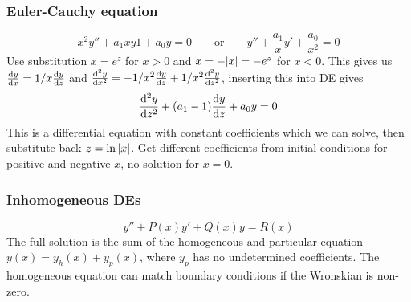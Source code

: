 \documentclass[a4paper, 10pt]{article}
\begin{document}
\begin{multicols*}{3}
\subsubsection*{\small Euler-Cauchy equation}
$$ x^2y'' + a_1xy1+a_0y = 0\qquad \text{or}\qquad y''+\frac{a_1}{x}y' + \frac{a_0}{x^2}=0$$
Use substitution $x=e^{z}$ for $x>0$ and $x=-\abs{x}=-e^{z}$ for $x<0$. This gives us $\dv{y}{x}=1/x\dv{y}{z}$ and $\dv[2]{y}{x} = -1/x^2 \dv{y}{z} + 1/x^2\dv[2]{y}{z}$, inserting this into DE gives
$$ \dv[2]{y}{z} + (a_1-1)\dv{y}{z} + a_0y = 0$$
This is a differential equation with constant coefficients which we can solve, then substitute back $z=\ln{\abs{x}}$. Get different coefficients from initial conditions for positive and negative $x$, no solution for $x=0$.

\subsubsection*{Inhomogeneous DEs}
$$y'' + P(x)y' +Q(x)y = R(x)$$
The full solution is the sum of the homogeneous and particular equation $y(x)=y_{h}(x)+y_p(x)$, where $y_p$ has no undetermined coefficients. The homogeneous equation can match boundary conditions if the Wronskian is non-zero.


\end{multicols*}
\end{document}
